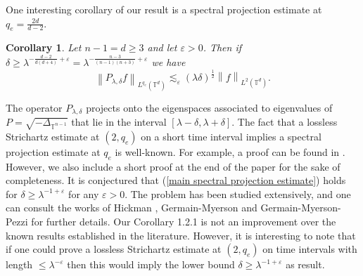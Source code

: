 \documentclass[11pt]{amsart}
\numberwithin{equation}{section}
\newcommand{\Tn}{\mathbb{T}^{n-1}}
\newcommand{\la}{\lambda}
\newcommand\norm[1]{\left\lVert#1\right\rVert}
\newcommand{\lpnorm}[3]{\norm{#1}_{L^{#2}(#3)}}
\newcommand{\T}[1][]{\mathbb{T}^#1}
\newcommand{\laplac}[1]{\Delta_{#1}}
\newtheorem{corollary}{Corollary}[theorem]
\begin{document}
One interesting corollary of our result is a spectral projection estimate at $q_e = \frac{2d}{d-2}$. 
\begin{corollary}
    Let $n-1 = d \geq 3$ and let $\varepsilon > 0$. Then if $\delta \geq \la^{-\frac{d-2}{d(d+4)}+\varepsilon} = \la^{-\frac{n-3}{(n-1)(n+3)} + \varepsilon}$ we have
    \begin{equation} \label{main spectral projection estimate}
        \lpnorm{P_{\la, \delta}f}{q_e}{\T{d}} \lesssim_{\varepsilon}(\la\delta)^{\frac{1}{2}}\lpnorm{f}{2}{\T{d}}.
    \end{equation}
\end{corollary}
\noindent
The operator $P_{\la,\delta}$ projects onto the eigenspaces associated to eigenvalues of $P = \sqrt{-\laplac{\Tn}}$ that lie in the interval $[\la - \delta, \la + \delta]$. The fact that a lossless Strichartz estimate at $(2,q_e)$ on a short time interval implies a spectral projection estimate at $q_e$ is well-known. For example, a proof can be found in \cite{BlairHuangSoggeStrichartz}. However, we also include a short proof at the end of the paper for the sake of completeness. It is conjectured that (\ref{main spectral projection estimate}) holds for $\delta \geq \la^{-1+\varepsilon}$ for any $\varepsilon > 0$. The problem has been studied extensively, and one can consult the works of Hickman \cite{HickmanUniformResolvent}, Germain-Myerson \cite{Germain2022} and Germain-Myerson-Pezzi \cite{GermainMyersonPezzi} for further details. Our Corollary 1.2.1 is not an improvement over the known results established in the literature. However, it is interesting to note that if one could prove a lossless Strichartz estimate at $(2,q_e)$ on time intervals with length $\leq \la^{-\varepsilon}$ then this would imply the lower bound $\delta \geq \la^{-1 + \varepsilon}$ as result. %
\end{document}
